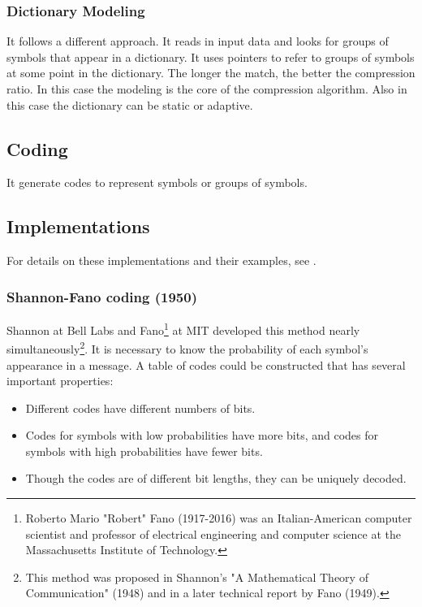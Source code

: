 \documentclass[12pt, a4paper]{report}
\begin{document}
\subsubsection{Dictionary Modeling}

It follows a different approach. It reads in input data and looks for groups of symbols that appear in a dictionary.
It uses pointers to refer to groups of symbols at some point in the dictionary.
The longer the match, the better the compression ratio.
In this case the modeling is the core of the compression algorithm.
Also in this case the dictionary can be static or adaptive.

\subsection{Coding}

It generate codes to represent symbols or groups of symbols.

\subsection{Implementations}

For details on these implementations and their examples, see \cite{TheDataCompressionBook2ndEdition}.

\subsubsection{Shannon-Fano coding (1950)}

Shannon at Bell Labs and Fano\footnote{Roberto Mario "Robert" Fano (1917-2016) was an Italian-American computer scientist and
professor of electrical engineering and computer science at the Massachusetts Institute of Technology.} at MIT developed this
method nearly simultaneously\footnote{This method was proposed in Shannon's "A Mathematical Theory of Communication" (1948) and
in a later technical report by Fano (1949).}.
It is necessary to know the probability of each symbol's appearance in a message.
A table of codes could be constructed that has several important properties:

\begin{itemize}
    \item Different codes have different numbers of bits.
    \item Codes for symbols with low probabilities have more bits, and codes for symbols with high probabilities have fewer bits.
    \item Though the codes are of different bit lengths, they can be uniquely decoded.
\end{itemize}
\end{document}
